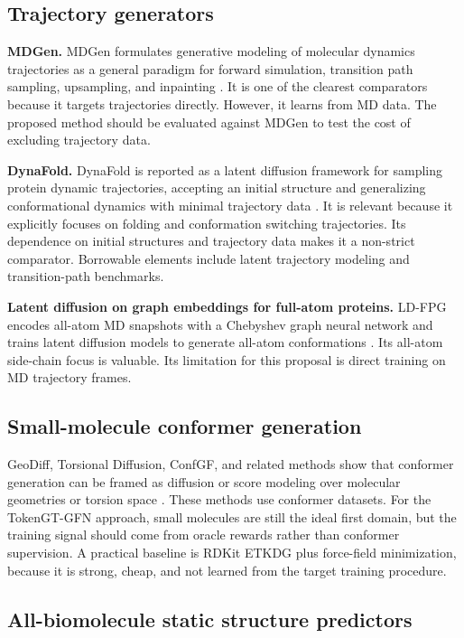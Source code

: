 \documentclass[11pt]{article}
\begin{document}
\subsection{Trajectory generators}

\textbf{MDGen.} MDGen formulates generative modeling of molecular dynamics trajectories as a general paradigm for forward simulation, transition path sampling, upsampling, and inpainting \cite{jing2024mdgen}. It is one of the clearest comparators because it targets trajectories directly. However, it learns from MD data. The proposed method should be evaluated against MDGen to test the cost of excluding trajectory data.

\textbf{DynaFold.} DynaFold is reported as a latent diffusion framework for sampling protein dynamic trajectories, accepting an initial structure and generalizing conformational dynamics with minimal trajectory data \cite{fan2025dynafold}. It is relevant because it explicitly focuses on folding and conformation switching trajectories. Its dependence on initial structures and trajectory data makes it a non-strict comparator. Borrowable elements include latent trajectory modeling and transition-path benchmarks.

\textbf{Latent diffusion on graph embeddings for full-atom proteins.} LD-FPG encodes all-atom MD snapshots with a Chebyshev graph neural network and trains latent diffusion models to generate all-atom conformations \cite{sengar2025ldfpg}. Its all-atom side-chain focus is valuable. Its limitation for this proposal is direct training on MD trajectory frames.

\subsection{Small-molecule conformer generation}

GeoDiff, Torsional Diffusion, ConfGF, and related methods show that conformer generation can be framed as diffusion or score modeling over molecular geometries or torsion space \cite{xu2022geodiff,jing2022torsional}. These methods use conformer datasets. For the TokenGT-GFN approach, small molecules are still the ideal first domain, but the training signal should come from oracle rewards rather than conformer supervision. A practical baseline is RDKit ETKDG plus force-field minimization, because it is strong, cheap, and not learned from the target training procedure.

\subsection{All-biomolecule static structure predictors}
\end{document}
